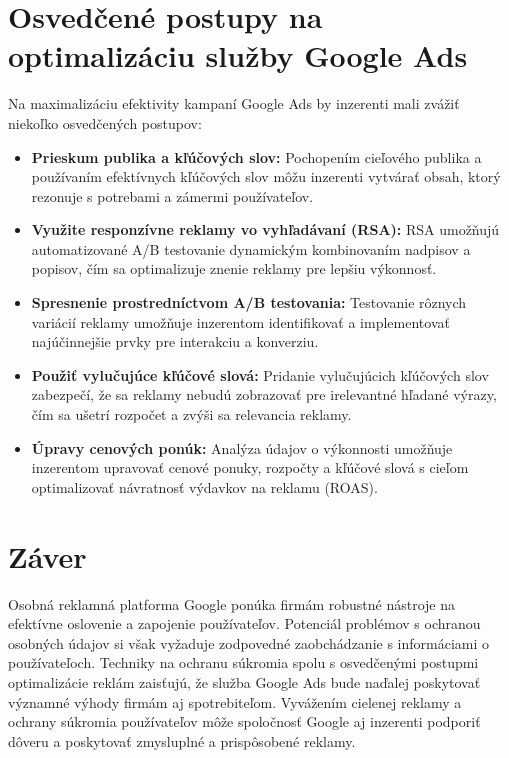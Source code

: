 \documentclass[10pt,slovak,a4paper]{article}
\begin{document}
\section{Osvedčené postupy na optimalizáciu služby Google Ads}
Na maximalizáciu efektivity kampaní Google Ads by inzerenti mali zvážiť niekoľko osvedčených postupov:

\begin{itemize}
    \item \textbf{Prieskum publika a kľúčových slov:} Pochopením cieľového publika a používaním efektívnych kľúčových 
    slov môžu inzerenti vytvárať obsah, ktorý rezonuje s potrebami a zámermi používateľov.
    \item \textbf{Využite responzívne reklamy vo vyhľadávaní (RSA):} RSA umožňujú automatizované A/B testovanie 
    dynamickým kombinovaním nadpisov a popisov, čím sa optimalizuje znenie reklamy pre lepšiu výkonnosť.
    \item \textbf{Spresnenie prostredníctvom A/B testovania:} Testovanie rôznych variácií reklamy umožňuje inzerentom 
    identifikovať a implementovať najúčinnejšie prvky pre interakciu a konverziu.
    \item \textbf{Použiť vylučujúce kľúčové slová:} Pridanie vylučujúcich kľúčových slov zabezpečí, že sa reklamy 
    nebudú zobrazovať pre irelevantné hľadané výrazy, čím sa ušetrí rozpočet a zvýši sa relevancia reklamy.
    \item \textbf{Úpravy cenových ponúk:} Analýza údajov o výkonnosti umožňuje inzerentom upravovať cenové ponuky, 
    rozpočty a kľúčové slová s cieľom optimalizovať návratnosť výdavkov na reklamu (ROAS).
\end{itemize}

\section{Záver}
Osobná reklamná platforma Google ponúka firmám robustné nástroje na efektívne oslovenie a zapojenie používateľov. Potenciál problémov s ochranou osobných údajov si však vyžaduje zodpovedné zaobchádzanie s informáciami o používateľoch. Techniky na ochranu súkromia spolu s osvedčenými postupmi optimalizácie reklám zaisťujú, že služba Google Ads bude naďalej poskytovať významné výhody firmám aj spotrebiteľom. Vyvážením cielenej reklamy a ochrany súkromia používateľov môže spoločnosť Google aj inzerenti podporiť dôveru a poskytovať zmysluplné a prispôsobené reklamy.



\end{document}
